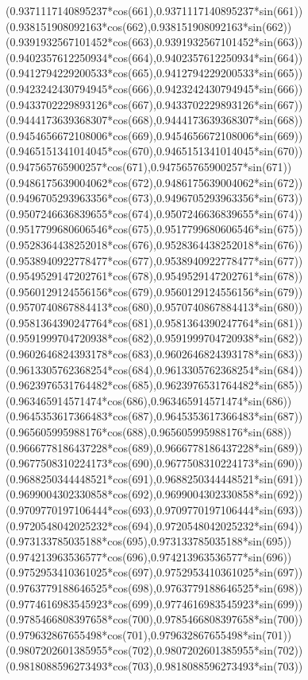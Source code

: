 {({0.9371117140895237*cos(661)},{0.9371117140895237*sin(661)})
({0.938151908092163*cos(662)},{0.938151908092163*sin(662)})
({0.9391932567101452*cos(663)},{0.9391932567101452*sin(663)})
({0.9402357612250934*cos(664)},{0.9402357612250934*sin(664)})
({0.9412794229200533*cos(665)},{0.9412794229200533*sin(665)})
({0.9423242430794945*cos(666)},{0.9423242430794945*sin(666)})
({0.9433702229893126*cos(667)},{0.9433702229893126*sin(667)})
({0.9444173639368307*cos(668)},{0.9444173639368307*sin(668)})
({0.9454656672108006*cos(669)},{0.9454656672108006*sin(669)})
({0.9465151341014045*cos(670)},{0.9465151341014045*sin(670)})
({0.947565765900257*cos(671)},{0.947565765900257*sin(671)})
({0.9486175639004062*cos(672)},{0.9486175639004062*sin(672)})
({0.9496705293963356*cos(673)},{0.9496705293963356*sin(673)})
({0.9507246636839655*cos(674)},{0.9507246636839655*sin(674)})
({0.9517799680606546*cos(675)},{0.9517799680606546*sin(675)})
({0.9528364438252018*cos(676)},{0.9528364438252018*sin(676)})
({0.9538940922778477*cos(677)},{0.9538940922778477*sin(677)})
({0.9549529147202761*cos(678)},{0.9549529147202761*sin(678)})
({0.9560129124556156*cos(679)},{0.9560129124556156*sin(679)})
({0.9570740867884413*cos(680)},{0.9570740867884413*sin(680)})
({0.9581364390247764*cos(681)},{0.9581364390247764*sin(681)})
({0.9591999704720938*cos(682)},{0.9591999704720938*sin(682)})
({0.9602646824393178*cos(683)},{0.9602646824393178*sin(683)})
({0.9613305762368254*cos(684)},{0.9613305762368254*sin(684)})
({0.9623976531764482*cos(685)},{0.9623976531764482*sin(685)})
({0.963465914571474*cos(686)},{0.963465914571474*sin(686)})
({0.9645353617366483*cos(687)},{0.9645353617366483*sin(687)})
({0.965605995988176*cos(688)},{0.965605995988176*sin(688)})
({0.9666778186437228*cos(689)},{0.9666778186437228*sin(689)})
({0.9677508310224173*cos(690)},{0.9677508310224173*sin(690)})
({0.9688250344448521*cos(691)},{0.9688250344448521*sin(691)})
({0.9699004302330858*cos(692)},{0.9699004302330858*sin(692)})
({0.9709770197106444*cos(693)},{0.9709770197106444*sin(693)})
({0.9720548042025232*cos(694)},{0.9720548042025232*sin(694)})
({0.973133785035188*cos(695)},{0.973133785035188*sin(695)})
({0.974213963536577*cos(696)},{0.974213963536577*sin(696)})
({0.9752953410361025*cos(697)},{0.9752953410361025*sin(697)})
({0.9763779188646525*cos(698)},{0.9763779188646525*sin(698)})
({0.9774616983545923*cos(699)},{0.9774616983545923*sin(699)})
({0.9785466808397658*cos(700)},{0.9785466808397658*sin(700)})
({0.979632867655498*cos(701)},{0.979632867655498*sin(701)})
({0.9807202601385955*cos(702)},{0.9807202601385955*sin(702)})
({0.9818088596273493*cos(703)},{0.9818088596273493*sin(703)})
}
